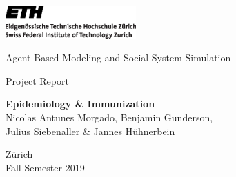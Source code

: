 \thispagestyle{empty}

\begin{center}
\includegraphics[width=5cm]{ETHlogo.eps}

\vspace{1.75\baselineskip}
\LARGE{ Agent-Based Modeling and Social System Simulation\\}

\vspace{0.3\baselineskip}
	
\large{Project Report}\\
\vspace{0.75\baselineskip}

\vfill
\textbf{\LARGE{Epidemiology \& Immunization}}\\
\vspace{1.5\baselineskip}
\large{Nicolas Antunes Morgado, Benjamin Gunderson,\\ Julius Siebenaller \& Jannes H{\"u}hnerbein}
\vfill

Z{\"u}rich\\
Fall Semester 2019\\
\vspace{0.5\baselineskip}
\end{center}
